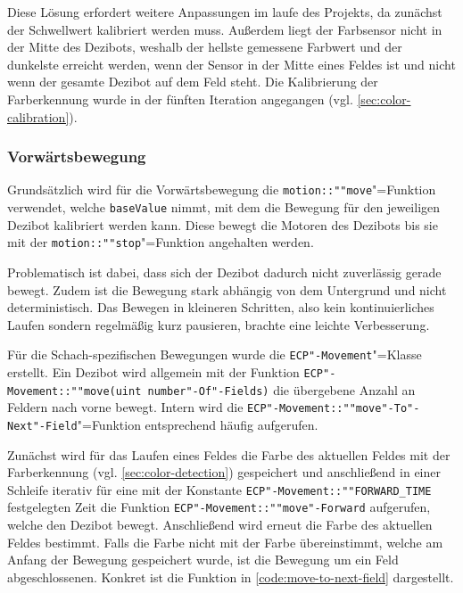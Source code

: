 Diese Lösung erfordert weitere Anpassungen im laufe des Projekts, da zunächst der Schwellwert kalibriert werden muss. Außerdem liegt der Farbsensor nicht in der Mitte des Dezibots, weshalb der hellste gemessene Farbwert und der dunkelste erreicht werden, wenn der Sensor in der Mitte eines Feldes ist und nicht wenn der gesamte Dezibot auf dem Feld steht. Die Kalibrierung der Farberkennung wurde in der fünften Iteration angegangen (vgl. \autoref{sec:color-calibration}).


\subsubsection{Vorwärtsbewegung}
\label{sec:move-straight}

Grundsätzlich wird für die Vorwärtsbewegung die \texttt{motion::""move}"=Funktion verwendet, welche \texttt{baseValue} nimmt, mit dem die Bewegung für den jeweiligen Dezibot kalibriert werden kann. Diese bewegt die Motoren des Dezibots bis sie mit der \texttt{motion::""stop}"=Funktion angehalten werden. 

Problematisch ist dabei, dass sich der Dezibot dadurch nicht zuverlässig gerade bewegt. Zudem ist die Bewegung stark abhängig von dem Untergrund und nicht deterministisch. Das Bewegen in kleineren Schritten, also kein kontinuierliches Laufen sondern regelmäßig kurz pausieren, brachte eine leichte Verbesserung. 

Für die Schach-spezifischen Bewegungen wurde die \texttt{ECP"-Movement}"=Klasse erstellt. Ein Dezibot wird allgemein mit der Funktion \texttt{ECP"-Movement::""move(uint number"-Of"-Fields)} die übergebene Anzahl an Feldern nach vorne bewegt. Intern wird die \texttt{ECP"-Movement::""move"-To"-Next"-Field}"=Funktion entsprechend häufig aufgerufen.

Zunächst wird für das Laufen eines Feldes die Farbe des aktuellen Feldes mit der Farberkennung (vgl. \autoref{sec:color-detection}) gespeichert und anschließend in einer Schleife iterativ für eine mit der Konstante \texttt{ECP"-Movement::""FORWARD\_TIME} festgelegten Zeit die Funktion \texttt{ECP"-Movement::""move"-Forward} aufgerufen, welche den Dezibot bewegt. Anschließend wird erneut die Farbe des aktuellen Feldes bestimmt. Falls die Farbe nicht mit der Farbe übereinstimmt, welche am Anfang der Bewegung gespeichert wurde, ist die Bewegung um ein Feld abgeschlossenen. Konkret ist die Funktion in \autoref{code:move-to-next-field} dargestellt.

\begin{listing}[h]
    \inputminted{cpp}{../assets/code/ECPMovement-moveToNextField.cpp}
    \caption{Code"=Ausschnitt zur \texttt{ECP"-Movement::""move"-To"-Next"-Field}"=Funktion}
    \label{code:move-to-next-field}
\end{listing}

